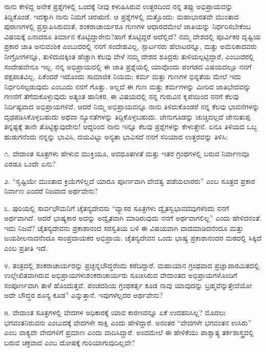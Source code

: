 ನಾನು ಕೇಳಿದ್ದ ಅನೇಕ ಪ್ರಶ್ನೆಗಳಲ್ಲಿ ಒಂದಕ್ಕೆ ನೀವು ಕಳುಹಿಸಿರುವ ಉತ್ತರದಿಂದ ನನ್ನ ತಪ್ಪು ಅಭಿಪ್ರಾಯವನ್ನು ತಿದ್ದಿಕೊಂಡೆ. ಇದಕ್ಕಾಗಿ ನಾನು ನಿಮಗೆ ಚಿರಋಣಿ. ಆ ಪ್ರಶ್ನೆಗಳಲ್ಲಿ ಮತ್ತೊಂದು: ಮಹಾಭಾರತವೇ ಮುಂತಾದ ಪುರಾಣಗಳಲ್ಲಿ ಪ್ರಸ್ತಾಪಿಸಿರುವಂತೆ, ಶಂಕರಾಚಾರ್ಯರೂ ಗುಣಗಳ ಆಧಾರದಮೇಲೆ ಜಾತಿಯನ್ನು ನಿರ್ಧರಿಸಬೇಕೆಂಬ ವಿಷಯಕ್ಕೆ ಏನಾದರೂ ತಿರ್ಮಾನ ಕೊಟ್ಟಿದ್ದಾರೇನು?ಹಾಗೆ ಕೊಟ್ಟಿದ್ದರೆ ಅದೆಲ್ಲಿದೆ? ನಮ್ಮ ದೇಶದಲ್ಲಿ ಪೂರ್ವಿಕರ ದೃಷ್ಟಿಯ ಪ್ರಕಾರ ಜಾತಿ ಅನುವಂಶಿಕ ಎಂಬುದರಲ್ಲಿ ನನಗೆ ಸಂದೇಹವಿಲ್ಲ. ಸ್ಪಾರ್ಟನರು ಹೆಲಾಟರನ್ನೂ, ಮತ್ತು ಅಮೆರಿಕಾದವರು ನೀಗ್ರೋಗಳನ್ನೂ, ತುಳಿದುದಕ್ಕಿಂತ ಹೆಚ್ಚಾಗಿ ಕೆಲವು ವೇಳೆ ನಮ್ಮ ದೇಶದ ಶೂದ್ರರು ತುಳಿಯಲ್ಪಟ್ಟಿದ್ದಾರೆ, ಎಂಬುದರಲ್ಲಿ ಸಂದೇಹವೇನೂ ಇಲ್ಲ. ನನ್ನ ಅಭಿಪ್ರಾಯದಲ್ಲಿ ಈ ಜಾತಿ ಪ್ರಶ್ನೆಯಲ್ಲಿ ಯಾವೊಂದು ಪಂಗಡದ ವಿಷಯದಲ್ಲೂ ನನಗೆ ಪಕ್ಷಪಾತವಿಲ್ಲ. ಏಕೆಂದರೆ ಇದೊಂದು ಸಾಮಾಜಿಕ ನಿಯಮ; ಕರ್ಮ ಮತ್ತು ಗುಣಗಳ ಭಿನ್ನತೆಯ ಮೇಲೆ ಇದು ನಿರ್ಧರಿಸಲ್ಪಡುವುದು ಎಂಬುದು ನನಗೆ ಗೊತ್ತು. ಅಲ್ಲದೆ ಈ ಗುಣ ಮತ್ತು ಕರ್ಮಗಳನ್ನು ಮೀರಿದ ಜಾತಿಭೇದವನ್ನು ಗಣನೆಗೆ ತೆಗೆದುಕೊಳ್ಳುವುದು ಅತ್ಯಂತ ಹಾನಿಕರ. ಈ ವಿಷಯದಲ್ಲಿ ನನ್ನ ಗುರುವಿನ ಕೃಪೆಯಿಂದ ನನಗೆ ಕೆಲವು ನಿರ್ದಿಷ್ಟವಾದ ಅಭಿಪ್ರಾಯಗಳಿವೆ. ಆದರೆ ನಿಮ್ಮ ಅಭಿಪ್ರಾಯವನ್ನೂ ನಾನು ತಿಳಿದುಕೊಂಡರೆ ನನ್ನ ಕೆಲವು ಭಾವನೆಗಳನ್ನು ದೃಢಪಡಿಸಿಕೊಳ್ಳಬಹುದು ಅಥವಾ ನ್ಯೂನತೆಗಳನ್ನು ತಿದ್ದಿಕೊಳ್ಳಬಹುದು. ಜೇನುಗೂಡನ್ನು ಚುಚ್ಚಿದಲ್ಲದೆ ಜೇನುತುಪ್ಪ ತನ್ನಷ್ಟಕ್ಕೆ ತಾನೇ ತೊಟ್ಟಿಕ್ಕುವುದೇನು! ಆದ್ದರಿಂದ ನಾನು ಇನ್ನೂ ಕೆಲವು ಪ್ರಶ್ನೆಗಳನ್ನು ಕೇಳುತ್ತೇನೆ. ಏನೂ ತಿಳಿಯದ ಒಬ್ಬ ಹುಡುಗನೆಂದು ನನ್ನನ್ನು ಭಾವಿಸಿ, ದಯವಿಟ್ಟು ಅನ್ಯತಾ ಭಾವಿಸದೆ ನನಗೆ ಸರಿಯಾದ ಉತ್ತರವನ್ನು ತಿಳಿಸಿ:

೧. ವೇದಾಂತ ಸೂತ್ರಗಳು ಹೇಳುವ ಮುಕ್ತಿಯೂ, ಅವಧೂತಗೀತೆ ಮತ್ತು ಇತರ ಗ್ರಂಥಗಳಲ್ಲಿ ಬರುವ ನಿರ್ವಾಣವೂ ಎರಡೂ ಒಂದೇ ಏನು?

೨. “ಸೃಷ್ಟಿಯೇ ಮುಂತಾದ ಕ್ರಿಯೆಗಳಿಲ್ಲದೆ ಯಾರೂ ಪೂರ್ಣವಾಗಿ ದೇವತ್ವ ಪಡೆಯಲಾರರು” ಎಂಬ ಸೂತ್ರದ ಪ್ರಕಾರ ನಿರ್ವಾಣ ಎಂದರೆ ನಿಜವಾದ ಅರ್ಥವೇನು?

೩. ಪುರಿಯಲ್ಲಿ ಸಾರ್ವಭೌಮನಿಗೆ ಚೈತನ್ಯದೇವನು “ವ್ಯಾಸರ ಸೂತ್ರಗಳು ದ್ವೈತಸ್ವಭಾವದವುಗಳೆಂದು ನನಗೆ ಅರ್ಥವಾಗಿದೆ. ಆದರೆ ಭಾಷ್ಯಕಾರ ಅದನ್ನು ಅದ್ವೈತವಾಗಿ ಮಾಡಿರುವುದು ನನಗೆ ಅರ್ಥವಾಗಲಿಲ್ಲ” ಎಂದು ಹೇಳಿದನಂತೆ. ಇದು ನಿಜವೆ? ಚೈತನ್ಯದೇವನು ಪ್ರಕಾಶಾನಂದ ಸರಸ್ವತಿಯ ಬಳಿ ಈ ವಿಷಯವಾಗಿ ವಾದಮಾಡಿದನೆಂದೂ ಮತ್ತು ಜಯಶೀಲನಾದನೆಂದೂ ಸಾಂಪ್ರದಾಯಕರ ಅಭಿಪ್ರಾಯ. ಚೈತನ್ಯದೇವನ ಒಂದು ಭಾಷ್ಯ ಪ್ರಕಾಶಾನಂದರ ಮಠದಲ್ಲಿ ಸಿಕ್ಕಿದೆ ಎಂಬ ಪ್ರತೀತಿ ಇದೆ.

೪. ತಂತ್ರದಲ್ಲಿ ಶಂಕರಾಚಾರ್ಯರನ್ನು ಪ್ರಚ್ಛನ್ನಬೌದ್ಧರೆಂದು ಕರೆದಿದ್ದಾರೆ. ಮಹಾಯಾನ ಗ್ರಂಥವಾದ ಪ್ರಜ್ಞಾಪಾರಮಿತದಲ್ಲಿ ಉಲ್ಲೇಖಿತವಾಗಿರುವ ಅಭಿಪ್ರಾಯಗಳು\break ಶಂಕರಾಚಾರ್ಯರು ಸೂಚಿಸಿರುವ ವೇದಾಂತದ ಅಭಿಪ್ರಾಯಗಳೊಂದಿಗೆ ಸಂಪೂರ್ಣವಾಗಿ ತಾಳೆ ಹೊಂದುತ್ತವೆ. ಪಂಚದಶಿಯ ಗ್ರಂಥಕರ್ತೃ ಕೂಡ ನಾವು ಯಾವುದನ್ನು ಬ್ರಹ್ಮವೆನ್ನುತ್ತೇವೆಯೋ ಅದೇ ಬೌದ್ಧರ ಶೂನ್ಯ ಕೂಡ” ಎನ್ನುತ್ತಾನೆ. ಇವುಗಳೆಲ್ಲದರ ಅರ್ಥವೇನು?

೫. ವೇದಾಂತ ಸೂತ್ರಗಳಲ್ಲಿ ವೇದಗಳ ಅಧಿಕಾರಕ್ಕೆ ಯಾವ ಕಾರಣವನ್ನೂ ಏಕೆ ಉದಹರಿಸಿಲ್ಲ? ಮೊದಲು ಭಗವಂತನಿರುವನು ಎಂಬುದಕ್ಕೆ ವೇದಗಳೇ ಸಾಕ್ಷಿ ಎಂದು ಹೇಳಿದ್ದಾರೆ. ಅನಂತರ “ವೇದಗಳೇ ಭಗವಂತನ ಉಸಿರು” ಎಂಬ ವಾಕ್ಯವೇ ವೇದಗಳಿಗೆ ಪ್ರಮಾಣ ಎಂದು ವಾದಿಸಿದ್ದಾರೆ. ಅಂದಮೇಲೆ ಈ ಹೇಳಿಕೆಯು ಪಾಶ್ಚಾತ್ಯ ತರ್ಕಶಾಸ್ತ್ರದಲ್ಲಿ ಬರುವ ಚಕ್ರವಾದ ಎಂಬ ದೋಷಕ್ಕೆ ಗುರಿಯಾಗುವುದಿಲ್ಲವೇ?

